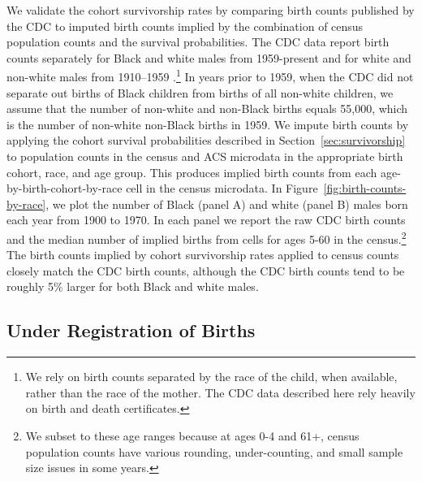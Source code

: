 \documentclass[12pt]{article}
\begin{document}
We validate the cohort survivorship rates by comparing birth counts published by the CDC to imputed birth counts implied by the combination of census population counts and the survival probabilities.   
The CDC data report birth counts separately for Black and white males from 1959-present and for white and non-white males from 1910--1959 .\footnote{We rely on birth counts separated by the race of the child, when available, rather than the race of the mother. 
The CDC data described here rely heavily on birth and death certificates.} 
In years prior to 1959, when the CDC did not separate out births of Black children from births of all non-white children, we assume that the number of non-white and non-Black births equals 55,000, which is the number of non-white non-Black births in 1959.  
We impute birth counts by applying the cohort survival probabilities described in Section~\ref{sec:survivorship} to population counts in the census and ACS microdata  in the appropriate birth cohort, race, and age group. 
This produces implied birth counts from each age-by-birth-cohort-by-race cell in the census microdata. 
In Figure~\ref{fig:birth-counts-by-race}, we plot the number of Black (panel A) and white (panel B) males born each year from 1900 to 1970. 
In each panel we report the raw CDC birth counts and the median number of implied births from cells for ages 5-60 in the census.\footnote{We subset to these age ranges because at ages 0-4 and 61+, census population counts have various rounding, under-counting, and small sample size issues in some years.} 
The birth counts implied by cohort survivorship rates applied to census counts closely match the CDC birth counts, although the CDC birth counts tend to be roughly 5\% larger for both Black and white males. 

\subsection{Under Registration of Births}
\end{document}
